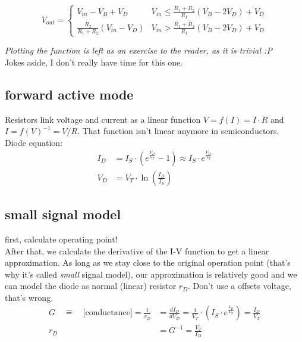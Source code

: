 \documentclass[11ypt]{extarticle}
\begin{document}
\begin{equation}
V_{out} = 
\begin{cases}
V_{in} - V_B + V_D & V_{in} \leq \frac{R_1 + R_2}{R_1}(V_B - 2V_D) + V_D \\
\frac{R_2}{R_1 + R_2}(V_{in} - V_D) & V_{in} > \frac{R_1 + R_2}{R_1}(V_B - 2V_D) + V_D
\end{cases}
\end{equation}

\textit{Plotting the function is left as an exercise to the reader, as it is trivial :P} \\
Jokes aside, I don't really have time for this one.

\subsection{forward active mode}

Resistors link voltage and current as a linear function $V = f(I) = I \cdot R$ and $I = f(V)^{-1} = V/R$. That function isn't linear anymore in semiconductors.
\\
Diode equation:
\begin{equation}
\begin{aligned}
    I_D &= I_S  \cdot \left( e^{\frac {V_D} {V_T}} - 1 \right) \approx I_S  \cdot e^{\frac {V_D} {V_T}} 
    \\
    V_D &= V_T \cdot \ln{\left( \frac{I_D}{I_S} \right)}
\end{aligned}
\end{equation}

\subsection{small signal model}

first, calculate operating point!
\\
After that, we calculate the derivative of the I-V function to get a linear approximation. As long as we stay close to the original operation point (that's why it's called \textit{small} signal model), our approximation is relatively good and we can model the diode as normal (linear) resistor $r_D$. Don't use a offsets voltage, that's wrong.
\begin{equation}
\begin{aligned}
    G \quad \hat{=} \quad \text{[conductance]} = \frac{1}{r_D} &= \frac{dI_D}{dV_D} = \frac{1} {V_T} \cdot \left( I_S \cdot  e^{\frac{V_D}{V_T}} \right)= \frac{I_D}{V_T}
    \\
    r_D &= G^{-1} = \frac{V_T}{I_D}
\end{aligned}
\end{equation}
\end{document}
